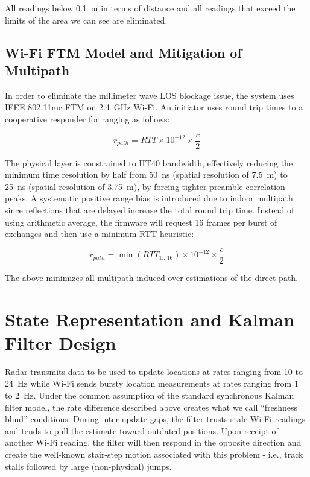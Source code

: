 All readings below 0.1~m in terms of distance and all readings that exceed the limits of the area we can see are eliminated.

\subsection{Wi-Fi FTM Model and Mitigation of Multipath}
\label{sec:ftmmodel}

In order to eliminate the millimeter wave LOS blockage issue, the system uses IEEE 802.11mc FTM on 2.4~GHz Wi-Fi. An initiator uses round trip times to a cooperative responder for ranging as follows:

\begin{equation}
r_{path} = RTT \times 10^{-12} \times \frac{c}{2}
\label{eq:ftm_basic}
\end{equation}

The physical layer is constrained to HT40 bandwidth, effectively reducing the minimum time resolution by half from 50~ns (spatial resolution of 7.5~m) to 25~ns (spatial resolution of 3.75~m), by forcing tighter preamble correlation peaks. A systematic positive range bias is introduced due to indoor multipath since reflections that are delayed increase the total round trip time. Instead of using arithmetic average, the firmware will request 16 frames per burst of exchanges and then use a minimum RTT heuristic:

\begin{equation}
r_{path} = \min(RTT_{1\dots16}) \times 10^{-12} \times \frac{c}{2}
\label{eq:ftm_min}
\end{equation}

The above minimizes all multipath induced over estimations of the direct path.

\section{State Representation and Kalman Filter Design}
\label{sec:kalman}

Radar transmits data to be used to update locations at rates ranging from 10 to 24~Hz while Wi-Fi sends bursty location measurements at rates ranging from 1 to 2~Hz. Under the common assumption of the standard synchronous Kalman filter model, the rate difference described above creates what we call ``freshness blind'' conditions. During inter-update gaps, the filter trusts stale Wi-Fi readings and tends to pull the estimate toward outdated positions. Upon receipt of another Wi-Fi reading, the filter will then respond in the opposite direction and create the well-known stair-step motion associated with this problem - i.e., track stalls followed by large (non-physical) jumps.

